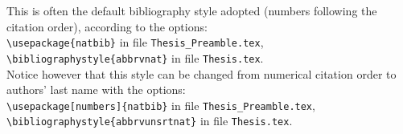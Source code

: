 This is often the default bibliography style adopted (numbers following the citation order), according to the options:\\
{\tt \textbackslash usepackage\{natbib\}} in file {\tt Thesis\_Preamble.tex},\\
{\tt \textbackslash bibliographystyle\{abbrvnat\}} in file {\tt Thesis.tex}.\\
%
Notice however that this style can be changed from numerical citation order to authors' last name with the options: \\
{\tt \textbackslash usepackage[numbers]\{natbib\}} in file {\tt Thesis\_Preamble.tex},\\
{\tt \textbackslash bibliographystyle\{abbrvunsrtnat\}} in file {\tt Thesis.tex}.
